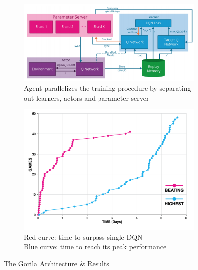 \begin{figure}[!htb]
		\centering
		\begin{subfigure}[b]{0.4\textwidth}
				\centering
				\includegraphics[width=\textwidth]{figures/algos/gorila.png}
				\caption{Agent parallelizes the training procedure by separating out learners, actors and parameter server}
				\label{fig:gorila_arch}
		\end{subfigure}
		\hfill
		\begin{subfigure}[b]{0.4\textwidth}
				\centering
				\includegraphics[width=\textwidth]{figures/algos/gorila_results.png}
				\caption{Red curve: time to surpass single DQN\\
								Blue curve: time to reach its peak performance}
				\label{fig:gorila_results}
		\end{subfigure}
		\hfill
		 \caption{The Gorila Architecture \& Results}
		 \label{fig:gorila}
\end{figure}

